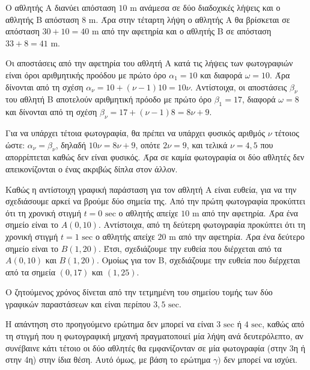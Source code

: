 
\begin{alist}
\item Ο αθλητής Α διανύει απόσταση $10\text{ m}$ ανάμεσα σε δύο διαδοχικές λήψεις και ο αθλητής Β απόσταση $8\text{ m}$. Άρα στην τέταρτη λήψη ο αθλητής Α θα βρίσκεται σε απόσταση $30 + 10 = 40\text{ m}$ από την αφετηρία και ο αθλητής Β σε απόσταση $33 + 8 = 41\text{ m}$.

\item Οι αποστάσεις από την αφετηρία του αθλητή Α κατά τις λήψεις των φωτογραφιών είναι όροι αριθμητικής προόδου με πρώτο όρο $\alpha_1 = 10$ και διαφορά $\omega = 10$. Άρα δίνονται από τη σχέση $\alpha_\nu = 10 + (\nu - 1)10 = 10\nu$. Αντίστοιχα, οι αποστάσεις $\beta_\nu$ του αθλητή Β αποτελούν αριθμητική πρόοδο με πρώτο όρο $\beta_1 = 17$, διαφορά $\omega = 8$ και δίνονται από τη σχέση $\beta_\nu = 17 + (\nu - 1)8 = 8\nu + 9$.

\item Για να υπάρχει τέτοια φωτογραφία, θα πρέπει να υπάρχει φυσικός αριθμός $\nu$ τέτοιος ώστε:
$\alpha_\nu = \beta_\nu$,
δηλαδή
$10\nu = 8\nu + 9$,
οπότε
$2\nu = 9$,
και τελικά $\nu = 4,5$ που απορρίπτεται καθώς δεν είναι φυσικός. Άρα σε καμία φωτογραφία οι δύο αθλητές δεν απεικονίζονται ο ένας ακριβώς δίπλα στον άλλον.

\item
\begin{rlist}
\item Καθώς η αντίστοιχη γραφική παράσταση για τον αθλητή Α είναι ευθεία, για να την σχεδιάσουμε αρκεί να βρούμε δύο σημεία της. Από την πρώτη φωτογραφία προκύπτει ότι τη χρονική στιγμή $t = 0\text{ sec}$ ο αθλητής απείχε $10\text{ m}$ από την αφετηρία. Άρα ένα σημείο είναι το $A(0, 10)$.
Αντίστοιχα, από τη δεύτερη φωτογραφία προκύπτει ότι τη χρονική στιγμή $t = 1\text{ sec}$ ο αθλητής απείχε $20\text{ m}$ από την αφετηρία. Άρα ένα δεύτερο σημείο είναι το $B(1, 20)$.
Έτσι, σχεδιάζουμε την ευθεία που διέρχεται από τα $A(0, 10)$ και $B(1, 20)$. Ομοίως για τον Β, σχεδιάζουμε την ευθεία που διέρχεται από τα σημεία $(0, 17)$ και $(1, 25)$.

\item Ο ζητούμενος χρόνος δίνεται από την τετμημένη του σημείου τομής των δύο γραφικών παραστάσεων και είναι περίπου $3,5\text{ sec}$.

\item Η απάντηση στο προηγούμενο ερώτημα δεν μπορεί να είναι $3\text{ sec}$ ή $4\text{ sec}$, καθώς από τη στιγμή που η φωτογραφική μηχανή πραγματοποιεί μία λήψη ανά δευτερόλεπτο, αν συνέβαινε κάτι τέτοιο οι δύο αθλητές θα εμφανίζονταν σε μία φωτογραφία (στην 3η ή στην 4η) στην ίδια θέση. Αυτό όμως, με βάση το ερώτημα $\gamma)$ δεν μπορεί να ισχύει.
\end{rlist}
\end{alist}

